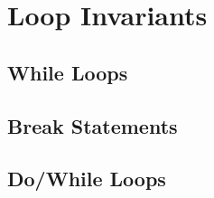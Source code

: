 \section{Loop Invariants}

\subsection{While Loops}
\subsection{Break Statements}
\subsection{Do/While Loops}